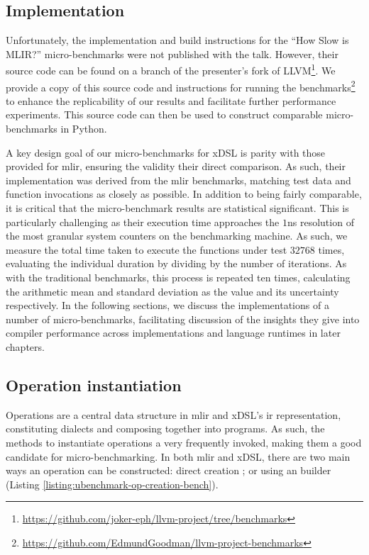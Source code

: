 \subsection{Implementation}
\label{ssec:ubenchmark-implementation}

Unfortunately, the implementation and build instructions for the ``How Slow is MLIR?'' micro-benchmarks were not published with the talk.
However, their source code can be found on a branch of the presenter's fork of LLVM\footnote{\url{https://github.com/joker-eph/llvm-project/tree/benchmarks}}. We provide a copy of this source code and instructions for running the benchmarks\footnote{\url{https://github.com/EdmundGoodman/llvm-project-benchmarks}} to enhance the replicability of our results and facilitate further performance experiments.
This source code can then be used to construct comparable micro-benchmarks in Python.

A key design goal of our micro-benchmarks for xDSL is parity with those provided for \ac{mlir}, ensuring the validity their direct comparison.
As such, their implementation was derived from the \ac{mlir} benchmarks, matching test data and function invocations as closely as possible.
In addition to being fairly comparable, it is critical that the micro-benchmark results are statistical significant. This is particularly challenging as their execution time approaches the $1$ns resolution of the most granular system counters on the benchmarking machine. As such, we measure the total time taken to execute the functions under test $32768$ times, evaluating the individual duration by dividing by the number of iterations. As with the traditional benchmarks, this process is repeated ten times, calculating the arithmetic mean and standard deviation as the value and its uncertainty respectively.
In the following sections, we discuss the implementations of a number of micro-benchmarks, facilitating discussion of the insights they give into compiler performance across implementations and language runtimes in later chapters.


\subsection{Operation instantiation}
\label{ssec:ubenchmark-operation-instantiation}

Operations are a central data structure in \ac{mlir} and xDSL's \ac{ir} representation, constituting dialects and composing together into programs.
As such, the methods to instantiate operations a very frequently invoked, making them a good candidate for micro-benchmarking.
In both \ac{mlir} and xDSL, there are two main ways an operation can be constructed: direct creation ; or using an builder  (Listing \ref{listing:ubenchmark-op-creation-bench}).

